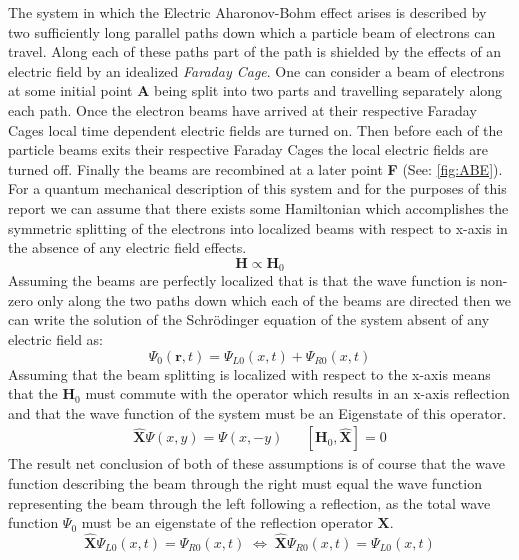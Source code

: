 \documentclass{article}
\begin{document}
The system in which the Electric Aharonov-Bohm effect arises is described by two sufficiently long parallel paths down which a particle beam of electrons can travel. Along each of these paths part of the path is shielded by the effects of an electric field by an idealized \textit{Faraday Cage}. One can consider a beam of electrons at some initial point \textbf{A} being split into two parts and travelling separately along each path. Once the electron beams have arrived at their respective Faraday Cages local time dependent electric fields are turned on. Then before each of the particle beams exits their respective Faraday Cages the local electric fields are turned off. Finally the beams are recombined at a later point \textbf{F} (See: \ref{fig:ABE}).\\

For a quantum mechanical description of this system and for the purposes of this report we can assume that there exists some Hamiltonian which accomplishes the symmetric splitting of the electrons into localized beams with respect to x-axis in the absence of any electric field effects.
\begin{equation*}
  \bm{H} \propto \bm{H}_0
\end{equation*}
Assuming the beams are perfectly localized that is that the wave function is non-zero only along the two paths down which each of the beams are directed then we can write the solution of the Schrödinger equation of the system absent of any electric field as:
\begin{equation*}
  \Psi_{0}(\bm{r},t)=\Psi_{L0}(x,t) + \Psi_{R0}(x,t)
\end{equation*}
Assuming that the beam splitting is localized with respect to the x-axis means that the $\bm{H}_0$ must commute with the operator which results in an x-axis reflection and that the wave function of the system must be an Eigenstate of this operator.
\begin{align*}
  \hat{\bm{X}} \Psi(x,y) = \Psi(x,-y) && \left[\bm{H}_{0}, \hat{\bm{X}} \right] = 0
\end{align*}
The result net conclusion of both of these assumptions is of course that the wave function describing the beam through the right must equal the wave function representing the beam through the left following a reflection, as the total wave function $\Psi_{0}$ must be an eigenstate of the reflection operator $\bm{X}$.
\begin{equation*}
  \hat{\bm{X}}\Psi_{L0}(x,t) = \Psi_{R0}(x,t) \; \Leftrightarrow \; \hat{\bm{X}}\Psi_{R0}(x,t) = \Psi_{L0}(x,t)
\end{equation*}
\end{document}
